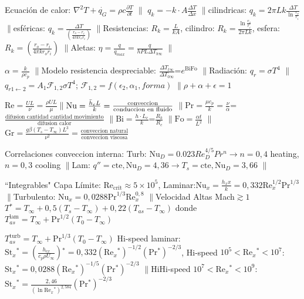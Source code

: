 \documentclass{article}
\newcommand{\cp}{c_p}
\newcommand{\cte}{\textrm{cte}}
\newcommand{\adim}[1]{\ensuremath{\mathrm{#1}}}
\newcommand{\Nusselt}{\adim{Nu}}
\newcommand{\Reynolds}{\adim{Re}}
\newcommand{\Grashof}{\adim{Gr}}
\newcommand{\Prandtl}{\adim{Pr}}
\newcommand{\Biot}{\adim{Bi}}
\newcommand{\Fourier}{\adim{Fo}}
\newcommand{\crit}{\mathrm{crit}}
\newcommand{\going}{\ensuremath{\rightarrow}}
\newcommand{\starit}{\ensuremath{^{*}}}
\newcommand{\Stanton}{\adim{St}}
\newcommand{\separar}{\ensuremath{\pmb{  \parallel{} }}}
\begin{document}
\vspace{\formuleoseparator}
\begin{formuleo}[TdC]
Ecuación de calor: $\nabla^2T+\Dot{q_G}=\rho c \frac{\partial T}{\partial t}$ \separar
$q_k=-k\cdot A\frac{\Delta T}{\Delta x} $ \separar cilindricas: $q_k=2\pi Lk\frac{\Delta T}{\ln{\frac{r_o}{r_i}}}$ \separar esféricas: $q_k=\frac{\Delta T}{\left(\frac{r_o - r_i}{4\pi k r_o r_i}\right)}$ \separar Resistencias: $R_k=\frac{L}{kA}$, cilindro: $R_k=\frac{\ln{\frac{r_o}{r_i}}}{2\pi Lk}$, esfera: $R_k={\left(\frac{r_o - r_i}{4\pi k r_o r_i}\right)}$ \separar Aletas: $\eta=\frac{q}{q_{max}}=\frac{q}{hPL\Delta T_{b\infty}}$ \separar

$\alpha =\frac{k}{\rho c_p}$ \separar Modelo resistencia despreciable: $ \frac{\Delta T_{t\infty}}{\Delta T_{0\infty}}$=$e^{\Biot\Fourier}$ \separar Radiación: $q_r=\sigma T^4$ \separar$q_{r 1\leftarrow 2}=A_1 \mathcal{F}_{1,2} \sigma  T^4$;  $\mathcal{F}_{1,2}=f(\epsilon_2, \alpha_1 ,forma) $ \separar$\rho + \alpha + \epsilon =1$
\end{formuleo}
\vspace{\formuleoseparator}
\begin{formuleo}[Adimensionales]
 $\Reynolds=\frac{UL}{\nu}=\frac{\rho UL}{\mu}$\separar    $\Nusselt=\frac{\Bar{h}_c L}{k}=\frac{\text{conveccion}}{\text{conduccion en fluido}}$ \separar $\Prandtl=\frac{\mu \cp}{k}=\frac{\nu}{\alpha}$=$\frac{\text{difusion\ cantidad\ cantidad\ movimiento}}{\text
 {difusion\ calor}}$ \separar $\Biot=\frac{h\cdot L_c}{k}$=$\frac{R_k}{R_c}$ \separar $\Fourier=\frac{\alpha t}{L^2}$ \separar $\Grashof=\frac{g \beta (T_s-T_\infty)L^3}{\nu ^2}=\frac{\text{conveccion natural}}{\text{conveccion viscosa}}$ 
\end{formuleo}
\vspace{\formuleoseparator}
\begin{formuleo}
 Correlaciones conveccion interna: Turb: $\Nusselt_{D}=0.023 R e_{D}^{4 / 5} P r^{n}$\going $n=0,4$ heating, $n=0,3$ cooling \separar Lam: $q''=\cte, \Nusselt_D=4,36$\going$T_s=\cte, \Nusselt_D = 3,66$  \separar
 
 ``Integrables"{} Capa Límite: $\Reynolds_{\crit}\approx5\times10^{5}$, Laminar:$\Nusselt_x=\frac{h_x x}{k}=0,332 \Reynolds_x^{1/2}\Prandtl^{1/3}$ \separar Turbulento: $\Nusselt_x = 0,0288\Prandtl^{1/3} \Reynolds_x^{0,8}$  \separar Velocidad Altas Mach$\gtrsim1$ $T\starit = T_\infty +0,5(T_s-T_\infty)+0,22(T_{as}-T_{\infty})$ donde $T_{as}^{\mathrm{lam}}=T_\infty+\Prandtl^{1/2}(T_0-T_\infty)$
 
 $T_{as}^{\mathrm{turb}}=T_\infty+\Prandtl^{1/3}(T_0-T_\infty)$ Hi-speed laminar: $\Stanton_x\starit=\left( \frac{h_{cx}}{\cp \rho U_\infty}\right)\starit=0,332(\Reynolds_x\starit)^{-1/2} (\Prandtl\starit)^{-2/3}$, Hi-speed $10^5<\Reynolds_x\starit<10^7$: $\Stanton_x\starit=0,0288(\Reynolds_x\starit)^{-1/5} (\Prandtl\starit)^{-2/3}$ \separar HiHi-speed $10^7<\Reynolds_x\starit<10^9$: $\Stanton_x\starit=\frac{2,46}{(\ln\Reynolds_x\starit)^{2,584}} (\Prandtl\starit)^{-2/3}$
\end{formuleo}
\end{document}
